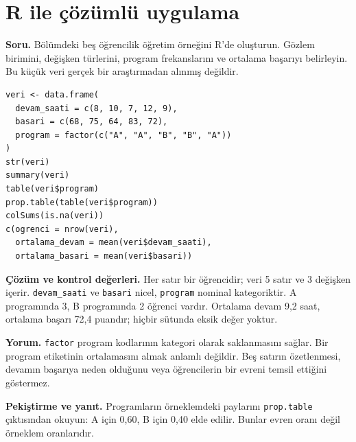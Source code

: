 \section{R ile çözümlü uygulama}
\label{sec:r-b01}

\textbf{Soru.} Bölümdeki beş öğrencilik öğretim örneğini R'de oluşturun.
Gözlem birimini, değişken türlerini, program frekanslarını ve ortalama başarıyı
belirleyin. Bu küçük veri gerçek bir araştırmadan alınmış değildir.

\begin{lstlisting}[style=prismR]
veri <- data.frame(
  devam_saati = c(8, 10, 7, 12, 9),
  basari = c(68, 75, 64, 83, 72),
  program = factor(c("A", "A", "B", "B", "A"))
)
str(veri)
summary(veri)
table(veri$program)
prop.table(table(veri$program))
colSums(is.na(veri))
c(ogrenci = nrow(veri),
  ortalama_devam = mean(veri$devam_saati),
  ortalama_basari = mean(veri$basari))
\end{lstlisting}

\begin{outputguidebox}
\textbf{Çözüm ve kontrol değerleri.} Her satır bir öğrencidir; veri
5 satır ve 3 değişken içerir. \texttt{devam\_saati} ve \texttt{basari}
nicel, \texttt{program} nominal kategoriktir. A programında 3, B programında
2 öğrenci vardır. Ortalama devam 9,2 saat, ortalama başarı 72,4 puandır;
hiçbir sütunda eksik değer yoktur.
\end{outputguidebox}

\textbf{Yorum.} \texttt{factor} program kodlarının kategori olarak
saklanmasını sağlar. Bir program etiketinin ortalamasını almak anlamlı
değildir. Beş satırın özetlenmesi, devamın başarıya neden olduğunu veya
öğrencilerin bir evreni temsil ettiğini göstermez.

\textbf{Pekiştirme ve yanıt.} Programların örneklemdeki paylarını
\texttt{prop.table} çıktısından okuyun: A için 0,60, B için 0,40 elde edilir. Bunlar evren oranı değil örneklem oranlarıdır.